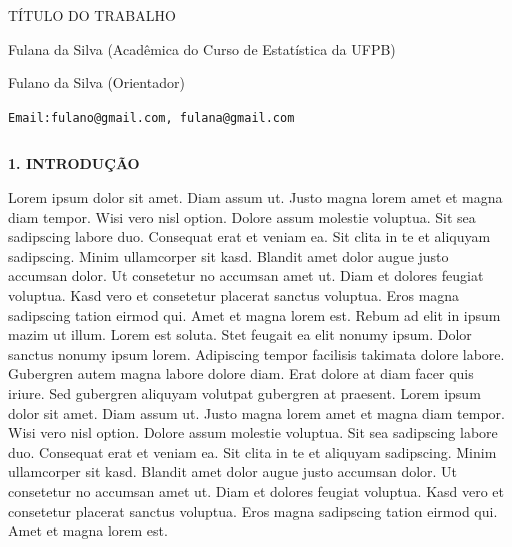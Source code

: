 \documentclass[final]{beamer}
\begin{document}
\begin{frame}[t]



\vspace*{7.0cm}
\centering
{ TÍTULO DO TRABALHO\par}
\vspace{0.8cm}
{ Fulana da Silva (Acadêmica do Curso de Estatística da UFPB)\par}
{ Fulano da Silva (Orientador)\par}
{\texttt{Email:fulano@gmail.com, fulana@gmail.com 
}\par}
\vspace{3cm}


\begin{columns}[t,totalwidth=0.6\paperwidth]
  \hspace*{2.5cm}
  \begin{column}{0.45\paperwidth}


    {\large\bfseries 1. INTRODUÇÃO}\par
    \justifying

    \vspace{1.3cm}
     Lorem ipsum dolor sit amet. Diam assum ut. Justo magna lorem amet et magna diam tempor. Wisi vero nisl option. Dolore assum molestie voluptua. Sit sea sadipscing labore duo. Consequat erat et veniam ea. Sit clita in te et aliquyam sadipscing. Minim ullamcorper sit kasd. Blandit amet dolor augue justo accumsan dolor. Ut consetetur no accumsan amet ut. Diam et dolores feugiat voluptua. Kasd vero et consetetur placerat sanctus voluptua. Eros magna sadipscing tation eirmod qui. Amet et magna lorem est. Rebum ad elit in ipsum mazim ut illum. Lorem est soluta. Stet feugait ea elit nonumy ipsum. Dolor sanctus nonumy ipsum lorem. Adipiscing tempor facilisis takimata dolore labore. Gubergren autem magna labore dolore diam. Erat dolore at diam facer quis iriure. Sed gubergren aliquyam volutpat gubergren at praesent. 
       Lorem ipsum dolor sit amet. Diam assum ut. Justo magna lorem amet et magna diam tempor. Wisi vero nisl option. Dolore assum molestie voluptua. Sit sea sadipscing labore duo. Consequat erat et veniam ea. Sit clita in te et aliquyam sadipscing. Minim ullamcorper sit kasd. Blandit amet dolor augue justo accumsan dolor. Ut consetetur no accumsan amet ut. Diam et dolores feugiat voluptua. Kasd vero et consetetur placerat sanctus voluptua. Eros magna sadipscing tation eirmod qui. Amet et magna lorem est.


\end{column}
\end{columns}
\end{frame}
\end{document}
